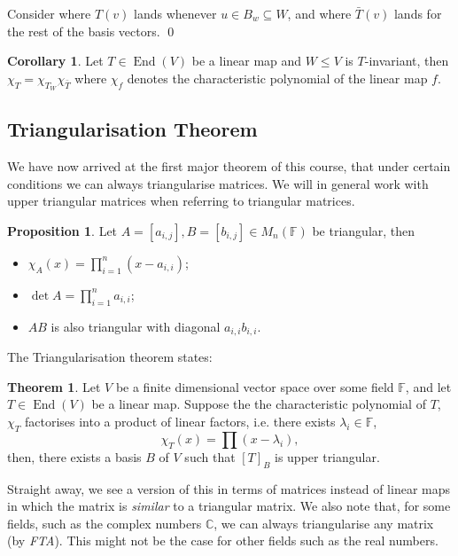 \documentclass[
]{article}
\theoremstyle{definition}
\newtheorem{theorem}{Theorem}
\newtheorem{prop}{Proposition}[section]
\newtheorem{corollary}{Corollary}[theorem]
\theoremstyle{definition}
\begin{document}
Consider where \(T(v)\) lands whenever \(u \in B_w \subseteq W\), and
where \(\bar{T}(v)\) lands for the rest of the basis vectors. \qed

\begin{corollary}\label{prod_char}
  Let \(T \in \mathop{\mathrm{End}}(V)\) be a linear map and \(W \le V\) is \(T\)-invariant, 
  then \(\chi_T = \chi_{T_W} \chi_{\bar{T}}\) where \(\chi_f\) denotes the 
  characteristic polynomial of the linear map \(f\). 
\end{corollary}

\hypertarget{triangularisation-theorem}{%
\subsection{Triangularisation Theorem}\label{triangularisation-theorem}}

We have now arrived at the first major theorem of this course, that
under certain conditions we can always triangularise matrices. We will
in general work with upper triangular matrices when referring to
triangular matrices.

\begin{prop}
  Let \(A = [a_{i, j}], B = [b_{i, j}] \in M_n(\mathbb{F})\) be triangular, then 
  \begin{itemize}
    \item \(\chi_A(x) = \prod_{i = 1}^n (x - a_{i, i})\);
    \item \(\det A = \prod_{i = 1}^n a_{i, i}\);
    \item \(AB\) is also triangular with diagonal \(a_{i, i}b_{i, i}\).
  \end{itemize}
\end{prop}

The Triangularisation theorem states:

\begin{theorem}
  Let \(V\) be a finite dimensional vector space over some field \(\mathbb{F}\), 
  and let \(T \in \mathop{\mathrm{End}}(V)\) be a linear map. Suppose the the characteristic 
  polynomial of \(T\), \(\chi_T\) factorises into a product of linear factors, 
  i.e. there exists \(\lambda_i \in \mathbb{F}\), 
  \[\chi_T(x) = \prod (x - \lambda_i),\]
  then, there exists a basis \(B\) of \(V\) such that \([T]_B\) is upper 
  triangular.
\end{theorem}

Straight away, we see a version of this in terms of matrices instead of
linear maps in which the matrix is \emph{similar} to a triangular
matrix. We also note that, for some fields, such as the complex numbers
\(\mathbb{C}\), we can always triangularise any matrix (by \emph{FTA}).
This might not be the case for other fields such as the real numbers.
\end{document}
